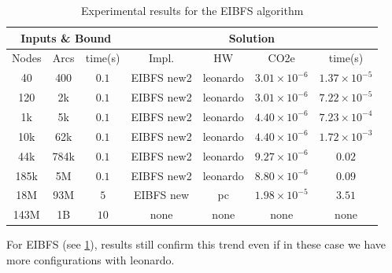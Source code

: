 \documentclass[a4paper,singleside,12pt]{report} %
\begin{document}
\begin{table}[h!]
    \centering
    \begin{tabular}{|ccc|cccc|}
        \hline
        \multicolumn{3}{|c|}{Inputs \& Bound} & \multicolumn{4}{c|}{Solution} \\
        \hline
        Nodes & Arcs & time(s) & Impl. & HW & CO2e & time(s) \\
        \hline
        40 & 400 & $0.1$ & EIBFS new2 & leonardo & $3.01 \times 10^{-6}$ & $1.37 \times 10^{-5}$ \\
        120 & 2k & $0.1$ & EIBFS new2 & leonardo & $3.01 \times 10^{-6}$ & $7.22 \times 10^{-5}$ \\
        1k & 5k & $0.1$ & EIBFS new2 & leonardo & $4.40 \times 10^{-6}$ & $7.23 \times 10^{-4}$ \\
        10k & 62k & $0.1$ & EIBFS new2 & leonardo & $4.40 \times 10^{-6}$ & $1.72 \times 10^{-3}$ \\
        44k & 784k & $0.1$ & EIBFS new2 & leonardo & $9.27 \times 10^{-6}$ & $0.02$ \\
        185k & 5M & $0.1$ & EIBFS new2 & leonardo & $8.80 \times 10^{-6}$ & $0.09$ \\
        18M & 93M & $5$ & EIBFS new & pc & $1.98 \times 10^{-5}$& $3.51$ \\
        143M & 1B & $10$ & none & none & none & none \\
        \hline
    \end{tabular}
    \caption{Experimental results for the EIBFS algorithm}
    \label{tab:eibfs_results_runtime}
\end{table}

For EIBFS (see \ref{tab:eibfs_results_runtime}), results still confirm this trend even if in these case we have more configurations with leonardo.
\end{document}

